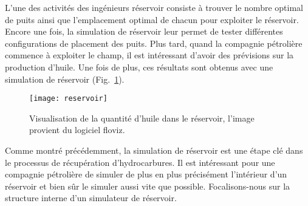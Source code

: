 L'une des activités des ingénieurs réservoir consiste à trouver le nombre optimal de puits ainsi que l'emplacement optimal de chacun pour exploiter le réservoir.
%
Encore une fois, la simulation de réservoir leur permet de tester différentes configurations de placement des puits.
%
Plus tard, quand la compagnie pétrolière commence à exploiter le champ, il est intéressant d'avoir des prévisions sur la production d'huile.
%
Une fois de plus, ces résultats sont obtenus avec une simulation de réservoir (Fig.~\ref{fig:floviz}).
\begin{figure}[!h]
  \centering
  \texttt{[image: reservoir]}
  \caption{Visualisation de la quantité d'huile dans le réservoir, l'image provient du logiciel floviz.}
\label{fig:floviz}
\end{figure}
Comme montré précédemment, la simulation de réservoir est une étape clé dans le processus de récupération d'hydrocarbures.
%
Il est intéressant pour une compagnie pétrolière de simuler de plus en plus précisément l'intérieur d'un réservoir et bien sûr le simuler aussi vite que possible.
%
Focalisons-nous sur la structure interne d'un simulateur de réservoir.
